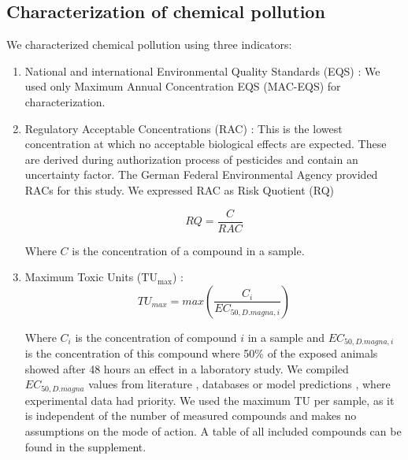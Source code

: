 \documentclass[journal=esthag,manuscript=article]{achemso}
\begin{document}
\subsection{Characterization of chemical pollution}
We characterized chemical pollution using three indicators:

\begin{enumerate}
  \item National and international Environmental Quality Standards (EQS) \citep{ogewv_verordnung_2011,european_union_directive_2013}:
  We used only Maximum Annual Concentration EQS (MAC-EQS) for characterization.
  \item Regulatory Acceptable Concentrations (RAC) \citep{brock_linking_2010}:
  This is the lowest concentration at which no acceptable biological effects are expected. 
  These are derived during authorization  process of pesticides and contain an uncertainty factor.
  The German Federal Environmental Agency provided RACs for this study.  
  We expressed  RAC as Risk Quotient (RQ)

  \begin{equation}
  RQ = \frac{C}{RAC}
  \end{equation}

  Where $C$ is the concentration of a compound in a sample.

  \item Maximum Toxic Units ($\mathrm{TU_{max}}$)  \citep{sprague_measurement_1970}: 
  \begin{equation}
  TU_{max} = max(\frac{C_i}{EC_{50, D.magna, i}})
  \end{equation}

  Where $C_i$ is the concentration of compound $i$ in a sample and $EC_{50, D.magna, i}$ is the concentration of this compound where 50\% of the exposed animals showed after 48 hours an effect in a laboratory study.
  We compiled $EC_{50, D.magna}$ values from literature \citep{malaj_organic_2014}, databases \citep{pesticide_action_network_pan_2015,u.s._epa_ecotoxicology_2015} or model predictions \citep{schuurmann_quantitative_2011}, where experimental data had priority.
  We used the maximum TU per sample, as it is independent of the number of measured compounds and makes no assumptions on the mode of action.
  A table of all included compounds can be found in the supplement.
\end{enumerate}
\end{document}
